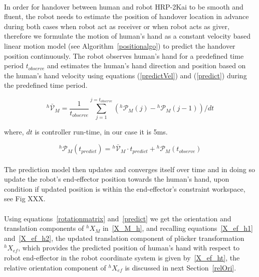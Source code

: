 \paragraph*{}
In order for handover between human and robot HRP-2Kai to be smooth and fluent, the robot needs to estimate the position of handover location in advance during both cases when robot act as receiver or when robot acts as giver, therefore we formulate the motion of human's hand as a constant velocity based linear motion model (see Algorithm~\ref{positionalgo}) to predict the handover position continuously. The robot observes human's hand for a predefined time period $t_{observe}$ and estimates the human's hand direction and position based on the human's hand velocity using equations (\ref{predictVel}) and (\ref{predict}) during the predefined time period. 

\begin{equation} \label{predictVel}
{}^{h}\mathcal{\bar{V}}_{M} = \frac{1}{t_{observe}}{\sum_{j=1}^{j=t_{observe}} ({}^{h}\mathcal{P}_{M}(j)-{}^{h}\mathcal{P}_{M}(j-1))/dt }
\end{equation}

where, $dt$ is controller run-time, in our case it is 5ms.

\begin{equation} \label{predict}
{}^{h}\mathcal{P}_M(t_{predict}) = {}^{h}\mathcal{\bar{V}}_{M} \cdot t_{predict}  + {}^{h}\mathcal{P}_{M}(t_{observe})
\end{equation}

\paragraph*{}
The prediction model then updates and converges itself over time and in doing so update the robot's end-effector position towards the human's hand, upon condition if updated position is within the end-effector's constraint workspace, see Fig XXX.

\paragraph*{}
Using equations~\ref{rotationmatrix} and~\ref{predict} we get the orientation and translation components of ${}^{h}{X}_M$ in~\ref{X_M_h}, and recalling equations~\ref{X_ef_h1} and~\ref{X_ef_h2}, the updated translation component of pl\"ucker transformation ${}^{h}{X}_{ef}$, which provides the predicted position of human's hand with respect to robot end-effector in the robot coordinate system is given by~\ref{X_ef_ht}, the relative orientation component of ${}^{h}{X}_{ef}$ is discussed in next Section~\ref{relOri}.

